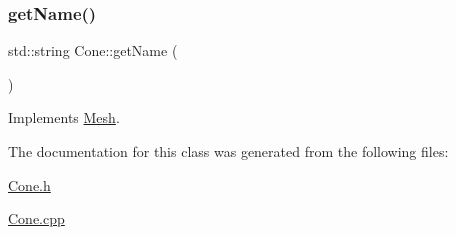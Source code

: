 \subsubsection{\texorpdfstring{getName()}{getName()}}
{\footnotesize\ttfamily std\+::string Cone\+::get\+Name (\begin{DoxyParamCaption}{ }\end{DoxyParamCaption})\hspace{0.3cm}{\ttfamily [virtual]}}



Implements \mbox{\hyperlink{class_mesh_aa131fe1c2586fe60988155db77c57272}{Mesh}}.



The documentation for this class was generated from the following files\+:\begin{DoxyCompactItemize}
\item 
\mbox{\hyperlink{_cone_8h}{Cone.\+h}}\item 
\mbox{\hyperlink{_cone_8cpp}{Cone.\+cpp}}\end{DoxyCompactItemize}
